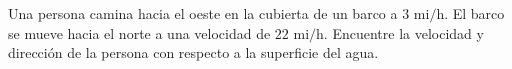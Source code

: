 \item Una persona camina hacia el oeste en la cubierta de un barco a $3\text{ mi/h}$. El barco se mueve hacia el norte a una velocidad de $22\text{ mi/h}$. Encuentre la velocidad y dirección de la persona con respecto a la superficie del agua.
